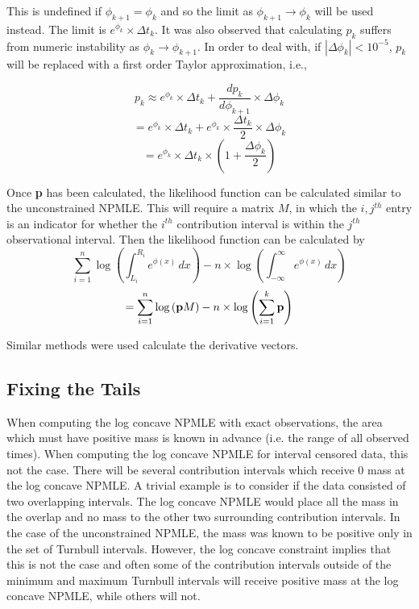 \documentclass[10pt]{article}
\begin{document}
	This is undefined if $\phi_{k+1} = \phi_k$ and so the limit as $\phi_{k+1} \rightarrow \phi_k$ will be used instead. The limit is $e^{\phi_k} \times \Delta t_k$. It was also observed that calculating $p_k$ suffers from numeric instability as $\phi_k \rightarrow \phi_{k+1}$. In order to deal with, if $|\Delta\phi_k | < 10^{-5}$, $p_k$ will be replaced with a first order Taylor approximation, i.e., 
	
	\[ p_k \approx e^{\phi_k} \times \Delta t_k + \frac{dp_k}{d\phi_{k+1}} \times \Delta \phi_k 
	\]
	\[
	= e^{\phi_k} \times \Delta t_k + e^{\phi_k} \times \frac {\Delta t_k} {2} \times \Delta \phi_k
	\]
	\[
	= e^{\phi_k} \times \Delta t_k \times \left(1 + \frac{\Delta \phi_k}{2} \right)
	\]
	
	Once {\bf p} has been calculated, the likelihood function can be calculated similar to the unconstrained NPMLE. This will require a matrix $M$, in which the $i, j^{th}$ entry is an indicator for whether the $i^{th}$ contribution interval is within the $j^{th}$ observational interval. Then the likelihood function can be calculated by
	\[ \displaystyle \sum_{i = 1}^n \log \left( \int_{L_i}^{R_i} e^ { \phi(x) } \,dx \right) - n \times \log \left(  \int_{-\infty}^{\infty} e^ { \phi(x) } \,dx \right) 
	\]
	\[=  \displaystyle \sum_{i = 1}^n \log \left({\bf p} M \right) - n \times \log \left( \sum_{i = 1}^{k} {\bf p} \right) 
	\]
	
	Similar methods were used calculate the derivative vectors.
	
		{\subsection{Fixing the Tails} }
	
	When computing the log concave NPMLE with exact observations, the area which must have positive mass is known in advance (i.e. the range of all observed times). When computing the log concave NPMLE for interval censored data, this not the case. There will be several contribution intervals which receive 0 mass at the log concave NPMLE. A trivial example is to consider if the data consisted of two overlapping intervals. The log concave NPMLE would place all the mass in the overlap and no mass to the other two surrounding contribution intervals. In the case of the unconstrained NPMLE, the mass was known to be positive only in the set of Turnbull intervals. However, the log concave constraint implies that this is not the case and often some of the contribution intervals outside of the minimum and maximum Turnbull intervals will receive positive mass at the log concave NPMLE, while others will not.
	 		
\end{document}
